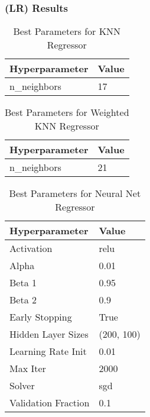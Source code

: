 \documentclass[a4paper, 12pt]{report}
\begin{document}
\subsubsection{(LR) Results}

\begin{table}[H]
    \centering
    \caption{Best Parameters for KNN Regressor}
    \label{tab:best_parameters_knn_LR_Abalone}
    \begin{tabular}{|l|l|}
    \hline
    \textbf{Hyperparameter} & \textbf{Value} \\ \hline
    n\_neighbors & 17 \\ \hline
    \end{tabular}
\end{table}

\begin{table}[H]
    \centering
    \caption{Best Parameters for Weighted KNN Regressor}
    \label{tab:best_parameters_weighted_knn_LR_Abalone}
    \begin{tabular}{|l|l|}
    \hline
    \textbf{Hyperparameter} & \textbf{Value} \\ \hline
    n\_neighbors & 21 \\ \hline
    \end{tabular}
\end{table}

\begin{table}[H]
    \centering
    \caption{Best Parameters for Neural Net Regressor}
    \label{tab:best_parameters_neural_net_LR_Abalone}
    \begin{tabular}{|l|l|}
    \hline
    \textbf{Hyperparameter} & \textbf{Value} \\ \hline
    Activation & relu \\ \hline
    Alpha & 0.01 \\ \hline
    Beta 1 & 0.95 \\ \hline
    Beta 2 & 0.9 \\ \hline
    Early Stopping & True \\ \hline
    Hidden Layer Sizes & (200, 100) \\ \hline
    Learning Rate Init & 0.01 \\ \hline
    Max Iter & 2000 \\ \hline
    Solver & sgd \\ \hline
    Validation Fraction & 0.1 \\ \hline
    \end{tabular}
\end{table}
\end{document}
